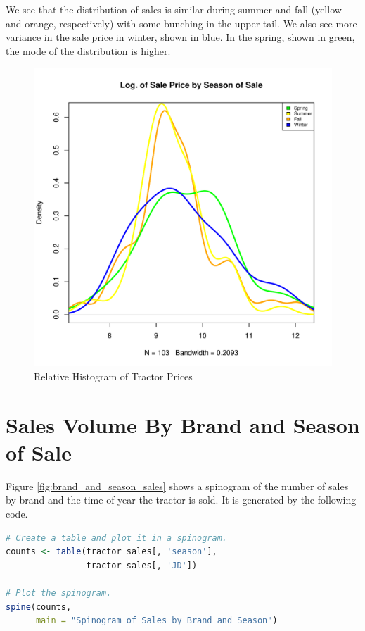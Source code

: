 \documentclass[11pt]{book}
\begin{document}
\pagebreak
We see that the distribution of sales is similar
during summer and fall (yellow and orange, respectively)
with some bunching in the upper tail.
We also see more variance in the sale price in winter,
shown in blue.
In the spring, shown in green, the mode of the distribution
is higher.

\begin{figure}[h!]
  \centering
  \includegraphics[scale = 0.5, keepaspectratio=true]{../Figures/dens_by_season}
  \caption{Relative Histogram of Tractor Prices} \label{fig:dens_by_season}
\end{figure}


\pagebreak
\section{Sales Volume By Brand and Season of Sale}

Figure \ref{fig:brand_and_season_sales}
shows a spinogram of the number of sales
by brand and the time of year the tractor is sold. 
It is generated by the following code.

\begin{lstlisting}[language=R]
# Create a table and plot it in a spinogram.
counts <- table(tractor_sales[, 'season'],
                tractor_sales[, 'JD'])

# Plot the spinogram.
spine(counts,
      main = "Spinogram of Sales by Brand and Season")
\end{lstlisting}
\end{document}
